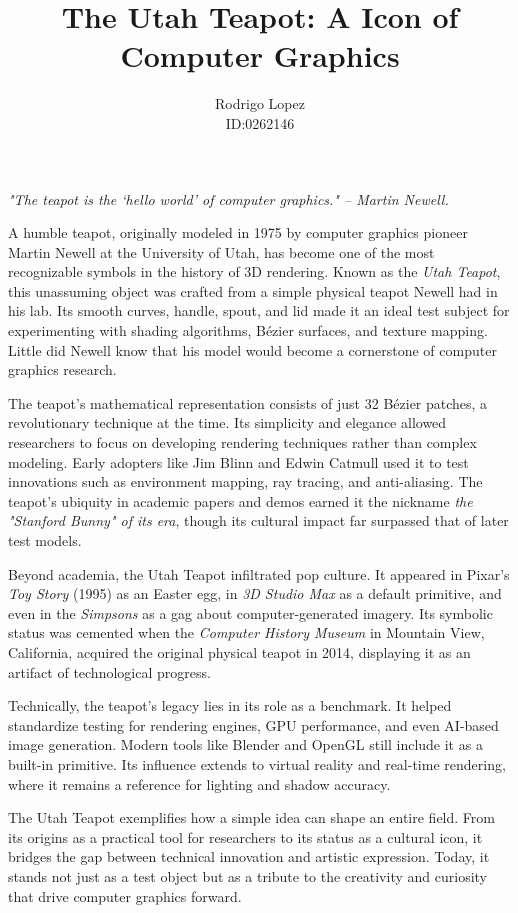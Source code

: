 \documentclass[12pt, letterpaper]{article}
\title{The Utah Teapot: A Icon of Computer Graphics}
\author{Rodrigo Lopez \\ ID:0262146}
\begin{document}
    \maketitle
    
    \onehalfspacing
    \justifying

    \noindent \textit{"The teapot is the ‘hello world’ of computer graphics." – Martin Newell.}
    
    \setlength{\parindent}{2em}
    A humble teapot, originally modeled in 1975 by computer graphics pioneer Martin Newell at the University of Utah, has become one of the most recognizable symbols in the history of 3D rendering. Known as the \textit{Utah Teapot}, this unassuming object was crafted from a simple physical teapot Newell had in his lab. Its smooth curves, handle, spout, and lid made it an ideal test subject for experimenting with shading algorithms, Bézier surfaces, and texture mapping. Little did Newell know that his model would become a cornerstone of computer graphics research.

    \setlength{\parindent}{2em}
    The teapot’s mathematical representation consists of just 32 Bézier patches, a revolutionary technique at the time. Its simplicity and elegance allowed researchers to focus on developing rendering techniques rather than complex modeling. Early adopters like Jim Blinn and Edwin Catmull used it to test innovations such as environment mapping, ray tracing, and anti-aliasing. The teapot’s ubiquity in academic papers and demos earned it the nickname \textit{the "Stanford Bunny" of its era}, though its cultural impact far surpassed that of later test models.

    \setlength{\parindent}{2em}
    Beyond academia, the Utah Teapot infiltrated pop culture. It appeared in Pixar’s \textit{Toy Story} (1995) as an Easter egg, in \textit{3D Studio Max} as a default primitive, and even in the \textit{Simpsons} as a gag about computer-generated imagery. Its symbolic status was cemented when the \textit{Computer History Museum} in Mountain View, California, acquired the original physical teapot in 2014, displaying it as an artifact of technological progress.

    \setlength{\parindent}{2em}
    Technically, the teapot’s legacy lies in its role as a benchmark. It helped standardize testing for rendering engines, GPU performance, and even AI-based image generation. Modern tools like Blender and OpenGL still include it as a built-in primitive. Its influence extends to virtual reality and real-time rendering, where it remains a reference for lighting and shadow accuracy.

    \setlength{\parindent}{2em}
    The Utah Teapot exemplifies how a simple idea can shape an entire field. From its origins as a practical tool for researchers to its status as a cultural icon, it bridges the gap between technical innovation and artistic expression. Today, it stands not just as a test object but as a tribute to the creativity and curiosity that drive computer graphics forward.
\end{document}

